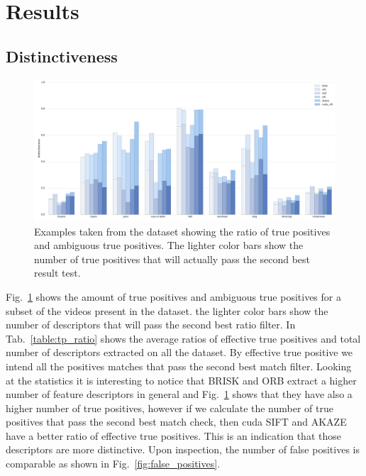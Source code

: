 \section{Results}

\subsection{Distinctiveness}

\begin{figure}[t]
\centerline{%
		\includegraphics[width=0.98\linewidth]{imgs/distinctivenessTP.pdf}}
    \vspace{-2mm} 
	\caption{Examples taken from the dataset showing the ratio of true positives and ambiguous true positives. The lighter color bars show the number of true positives that will actually pass the second best result test.}
	\label{fig:distinctiveness}
\end{figure}

Fig.~\ref{fig:distinctiveness} shows the amount of true positives and ambiguous true positives for a subset of the videos present in the dataset. the lighter color bars show the number of descriptors that will pass the second best ratio filter. In Tab.~\ref{table:tp_ratio} shows the average ratios of effective true positives and total number of descriptors extracted on all the dataset. By effective true positive we intend all the positives matches that pass the second best match filter. Looking at the statistics it is interesting to notice that BRISK and ORB extract a higher number of feature descriptors in general and Fig.~\ref{fig:distinctiveness} shows that they have also a higher number of true positives, however if we calculate the number of true positives that pass the second best match check, then cuda SIFT and AKAZE have a better ratio of effective true positives. This is an indication that those descriptors are more distinctive. Upon inspection, the number of false positives is comparable as shown in Fig.~\ref{fig:false_positives}.

